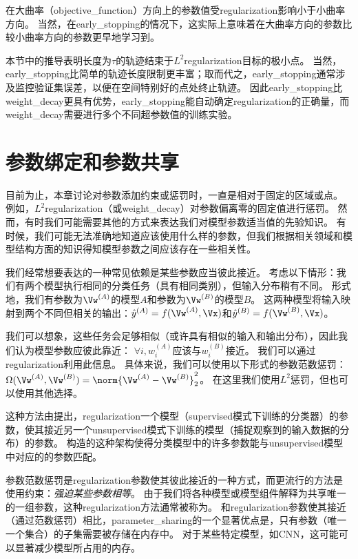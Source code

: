 在大曲率（\gls{objective_function}）方向上的参数值受\gls{regularization}影响小于小曲率方向。
当然，在\gls{early_stopping}的情况下，这实际上意味着在大曲率方向的参数比较小曲率方向的参数更早地学习到。
 
本节中的推导表明长度为$\tau$的轨迹结束于$L^2$\gls{regularization}目标的极小点。
当然，\gls{early_stopping}比简单的轨迹长度限制更丰富；取而代之，\gls{early_stopping}通常涉及监控验证集误差，以便在空间特别好的点处终止轨迹。
因此\gls{early_stopping}比\gls{weight_decay}更具有优势，\gls{early_stopping}能自动确定\gls{regularization}的正确量，而\gls{weight_decay}需要进行多个不同超参数值的训练实验。


\section{参数绑定和参数共享}
\label{sec:parameter_tying_and_parameter_sharing}
目前为止，本章讨论对参数添加约束或惩罚时，一直是相对于固定的区域或点。
例如，$L^2$\gls{regularization}（或\gls{weight_decay}）对参数偏离零的固定值进行惩罚。
然而，有时我们可能需要其他的方式来表达我们对模型参数适当值的先验知识。
有时候，我们可能无法准确地知道应该使用什么样的参数，但我们根据相关领域和模型结构方面的知识得知模型参数之间应该存在一些相关性。

我们经常想要表达的一种常见依赖是某些参数应当彼此接近。
考虑以下情形：我们有两个模型执行相同的分类任务（具有相同类别），但输入分布稍有不同。
形式地，我们有参数为$\Vw^{(A)}$的模型$A$和参数为$\Vw^{(B)}$的模型$B$。
这两种模型将输入映射到两个不同但相关的输出：$\hat y^{(A)} = f(\Vw^{(A)}, \Vx)$和$\hat y^{(B)} = f(\Vw^{(B)}, \Vx)$。

我们可以想象，这些任务会足够相似（或许具有相似的输入和输出分布），因此我们认为模型参数应彼此靠近：
$\forall i, w_i^{(A)}$应该与$ w_i^{(B)}$接近。
我们可以通过\gls{regularization}利用此信息。
具体来说，我们可以使用以下形式的参数范数惩罚：
$\Omega(\Vw^{(A)}, \Vw^{(B)}) = \norm{\Vw^{(A)}-\Vw^{(B)}}_2^2$。
在这里我们使用$L^2$惩罚，但也可以使用其他选择。

这种方法由\cite{Lasserre-et-al-2006}提出，\gls{regularization}一个模型（\gls{supervised}模式下训练的分类器）的参数，使其接近另一个\gls{unsupervised}模式下训练的模型（捕捉观察到的输入数据的分布）的参数。
构造的这种架构使得分类模型中的许多参数能与\gls{unsupervised}模型中对应的的参数匹配。

参数范数惩罚是\gls{regularization}参数使其彼此接近的一种方式，而更流行的方法是使用约束：\emph{强迫某些参数相等}。
由于我们将各种模型或模型组件解释为共享唯一的一组参数，这种\gls{regularization}方法通常被称为。
和\gls{regularization}参数使其接近（通过范数惩罚）相比，\gls{parameter_sharing}的一个显著优点是，只有参数（唯一一个集合）的子集需要被存储在内存中。
对于某些特定模型，如\gls{CNN}，这可能可以显著减少模型所占用的内存。


